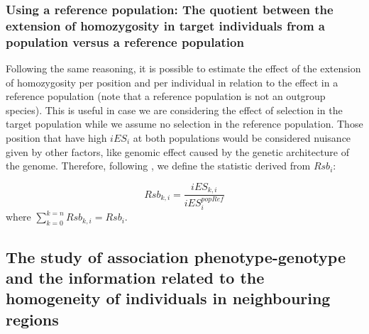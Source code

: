 \documentclass[a4paper,11pt]{article}
\begin{document}
\subsubsection{Using a reference population: The quotient between the extension of homozygosity in target individuals from a population versus a reference population}
Following the same reasoning, it is possible to estimate the effect of the extension of homozygosity per position and per individual in relation to the effect in a reference population (note that a reference population is not an outgroup species). This is useful in case we are considering the effect of selection in the target population while we assume no selection in the reference population. Those position that have high $iES_i$ at both populations would be considered nuisance given by other factors, like genomic effect caused by the genetic architecture of the genome. Therefore, following \citep{Tang:2007aa}, we define the statistic derived from $Rsb_i$:

\begin{equation}
Rsb_{k,i} = \frac{iES_{k,i}}{iES_{i}^{popRef}}
\end{equation}
where $\sum_{k=0}^{k=n}Rsb_{k,i} = Rsb_i.$

\subsection{The study of association phenotype-genotype and the information related to the homogeneity of individuals in neighbouring regions}

\end{document}
